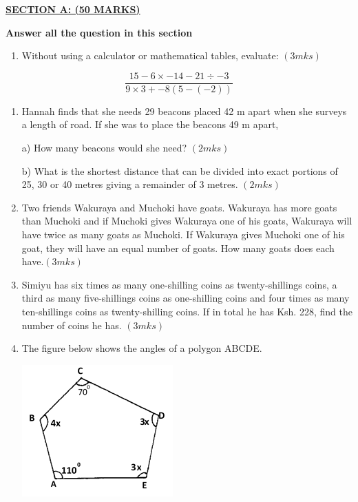 \documentclass[
  a4paperpaper,
]{scrbook}
\providecommand{\tightlist}{%
  \setlength{\itemsep}{0pt}\setlength{\parskip}{0pt}}\usepackage{longtable,booktabs,array}
\begin{document}
\begin{tcolorbox}[enhanced jigsaw, left=2mm, colframe=quarto-callout-note-color-frame, toptitle=1mm, opacitybacktitle=0.6, rightrule=.15mm, colbacktitle=quarto-callout-note-color!10!white, colback=white, arc=.35mm, breakable, leftrule=.75mm, bottomtitle=1mm, bottomrule=.15mm, title=\textcolor{quarto-callout-note-color}{\faInfo}\hspace{0.5em}{Model Sample Paper 3}, titlerule=0mm, coltitle=black, toprule=.15mm, opacityback=0]

\ul{\textbf{SECTION A: (50 MARKS)}}

\textbf{Answer all the question in this section}

\begin{enumerate}
\def\labelenumi{\arabic{enumi}.}
\tightlist
\item
  Without using a calculator or mathematical tables, evaluate:
  \((3mks)\)
\end{enumerate}

\[\frac{15-6\times-14-21\div-3}{9\times3+-8(5-(-2))} \]

\begin{enumerate}
\def\labelenumi{\arabic{enumi}.}
\setcounter{enumi}{1}
\item
  Hannah finds that she needs 29 beacons placed 42 m apart when she
  surveys a length of road. If she was to place the beacons 49 m apart,

  a) How many beacons would she need? \((2mks)\)

  b) What is the shortest distance that can be divided into exact
  portions of 25, 30 or 40 metres giving a remainder of 3 metres.
  \((2mks)\)
\item
  Two friends Wakuraya and Muchoki have goats. Wakuraya has more goats
  than Muchoki and if Muchoki gives Wakuraya one of his goats, Wakuraya
  will have twice as many goats as Muchoki. If Wakuraya gives Muchoki
  one of his goat, they will have an equal number of goats. How many
  goats does each have.\((3mks)\)
\item
  Simiyu has six times as many one-shilling coins as twenty-shillings
  coins, a third as many five-shillings coins as one-shilling coins and
  four times as many ten-shillings coins as twenty-shilling coins. If in
  total he has Ksh. 228, find the number of coins he has. \((3mks)\)
\item
  The figure below shows the angles of a polygon ABCDE.

  \includegraphics{figures/fig1.png}


\end{enumerate}
\end{tcolorbox}
\end{document}
